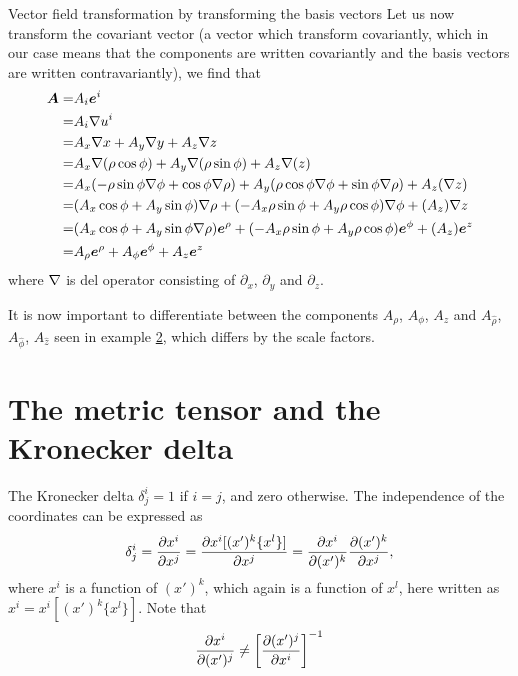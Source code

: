 \documentclass[a4paper, 12pt]{article}
\begin{document}
\begin{example}{Vector field transformation by transforming the basis vectors}
 Let us now transform the covariant vector (a vector which transform 
 covariantly, which in our case means that the components are written 
 covariantly and the basis vectors are  written  contravariantly), we find that
 \begin{align*}
     \boldsymbol{A}
     =& A_i\boldsymbol{e}^i\\
     =& A_i\nabla u^i\\
     =& A_x\nabla x + A_y\nabla y + A_z\nabla z\\
     =& A_x\nabla (\rho \cos\phi) + A_y\nabla (\rho \sin\phi) + A_z\nabla (z)\\
     =& A_x (-\rho \sin\phi \nabla \phi + \cos\phi \nabla \rho)
      + A_y ( \rho \cos\phi \nabla \phi + \sin\phi \nabla \rho)
      + A_z (\nabla z)\\
     =&  ( A_x\cos\phi + A_y\sin\phi)\nabla \rho
      +  (-A_x\rho \sin\phi + A_y\rho \cos\phi )\nabla \phi
      +  (A_z)\nabla z\\
     =&  ( A_x\cos\phi + A_y\sin\phi \nabla \rho)\boldsymbol{e}^\rho
      +  (-A_x\rho \sin\phi + A_y\rho \cos\phi )\boldsymbol{e}^\phi
      +  (A_z)\boldsymbol{e}^z\\
     =&  A_\rho\boldsymbol{e}^\rho
      +  A_\phi\boldsymbol{e}^\phi
      +  A_z\boldsymbol{e}^z
 \end{align*}
 where $\nabla$ is del operator consisting of $\partial_x$, $\partial_y$ and 
 $\partial_z$.
 
 It is now important to differentiate between the components $A_\rho$, 
$A_\phi$,  $A_z$ and $A_{\hat{\rho}}$, $A_{\hat{\phi}}$, $A_{\hat{z}}$ seen in 
example  \hyperref[ex:vft]{2},  which differs by  the  scale factors.
\end{example}
%




\section{The metric tensor and the Kronecker delta}\label{sec:metrics}
The Kronecker delta $\delta^i_j = 1$ if $i=j$, and zero otherwise. The
independence of the coordinates can be expressed as
%
\begin{align*}
 \delta^i_j = \frac{\partial {x^i}}{\partial{x^j}} = \frac{\partial {x^i[(x')^k\{x^l\}]}}{\partial{x^j}} =
 \frac{\partial {x^i}}{\partial{(x')^k}}\frac{\partial {(x')^k}}{\partial{x^j}},
\end{align*}
%
where $x^i$ is a function of $(x')^k$, which again is a function of $x^l$, here
written as $x^i = x^i[(x')^k\{x^l\}]$. Note that
%
\begin{align*}
 \frac{\partial {x^i}}{\partial{(x')^j}} \neq \left[\frac{\partial {(x')^j}}{\partial{x^i}}\right]^{-1}
\end{align*}
\end{document}
